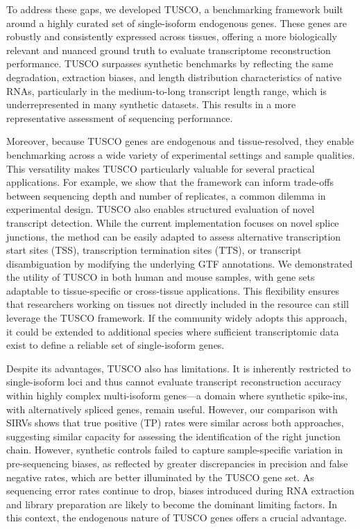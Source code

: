 \documentclass[pdflatex,sn-nature]{sn-jnl}%
\begin{document}
To address these gaps, we developed TUSCO, a benchmarking framework built around a highly curated set of single-isoform endogenous genes. These genes are robustly and consistently expressed across tissues, offering a more biologically relevant and nuanced ground truth to evaluate transcriptome reconstruction performance. TUSCO surpasses synthetic benchmarks by reflecting the same degradation, extraction biases, and length distribution characteristics of native RNAs, particularly in the medium-to-long transcript length range, which is underrepresented in many synthetic datasets. This results in a more representative assessment of sequencing performance.

Moreover, because TUSCO genes are endogenous and tissue-resolved, they enable benchmarking across a wide variety of experimental settings and sample qualities. This versatility makes TUSCO particularly valuable for several practical applications. For example, we show that the framework can inform trade-offs between sequencing depth and number of replicates, a common dilemma in experimental design. TUSCO also enables structured evaluation of novel transcript detection. While the current implementation focuses on novel splice junctions, the method can be easily adapted to assess alternative transcription start sites (TSS), transcription termination sites (TTS), or transcript disambiguation by modifying the underlying GTF annotations. We demonstrated the utility of TUSCO in both human and mouse samples, with gene sets adaptable to tissue-specific or cross-tissue applications. This flexibility ensures that researchers working on tissues not directly included in the resource can still leverage the TUSCO framework. If the community widely adopts this approach, it could be extended to additional species where sufficient transcriptomic data exist to define a reliable set of single-isoform genes.

Despite its advantages, TUSCO also has limitations. It is inherently restricted to single-isoform loci and thus cannot evaluate transcript reconstruction accuracy within highly complex multi-isoform genes---a domain where synthetic spike-ins, with alternatively spliced genes, remain useful. However, our comparison with SIRVs shows that true positive (TP) rates were similar across both approaches, suggesting similar capacity for assessing the identification of the right junction chain. However, synthetic controls failed to capture sample-specific variation in pre-sequencing biases, as reflected by greater discrepancies in precision and false negative rates, which are better illuminated by the TUSCO gene set. As sequencing error rates continue to drop, biases introduced during RNA extraction and library preparation are likely to become the dominant limiting factors. In this context, the endogenous nature of TUSCO genes offers a crucial advantage.
\end{document}
